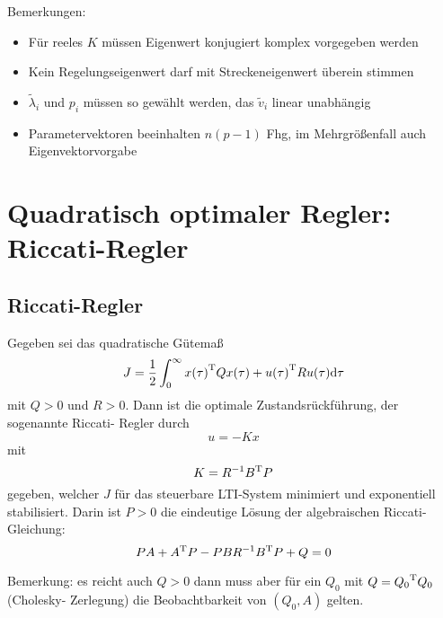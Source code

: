 Bemerkungen:
\begin{itemize}
    \item Für reeles $K$ müssen Eigenwert konjugiert komplex vorgegeben werden
    \item Kein Regelungseigenwert darf mit Streckeneigenwert überein stimmen
    \item $\tilde{\lambda}_i$ und $p_i$ müssen so gewählt werden, das $\tilde{v}_i$
        linear unabhängig
    \item Parametervektoren beeinhalten $n(p-1)$ Fhg, im Mehrgrößenfall
        auch Eigenvektorvorgabe
\end{itemize}

\section{Quadratisch optimaler Regler: Riccati-Regler}
\subsection{Riccati-Regler}
Gegeben sei das quadratische Gütemaß
\begin{equation}
    J = \frac{1}{2} \int_0^\infty {x(\tau)}^\text{T} Q x(\tau)
        + {u(\tau)}^\text{T} R u(\tau) \text{d} \tau
\end{equation}
mit $Q>0$ und $R>0$. Dann ist die optimale Zustandsrückführung, der sogenannte Riccati-
Regler durch
\begin{equation}
    u = -Kx
\end{equation}
mit
\begin{equation}
    K = R^{-1} {B}^\text{T} P
\end{equation}
gegeben, welcher $J$ für das steuerbare LTI-System
\sy
minimiert und exponentiell stabilisiert. Darin ist $P>0$ die eindeutige Lösung der
algebraischen Riccati-Gleichung:
\begin{equation}
    PA+{A}^\text{T}P-PBR^{-1}{B}^\text{T}P+Q=0
\end{equation}

Bemerkung: es reicht auch $Q>0$ dann muss aber für ein $Q_0$ mit $Q={Q_0}^\text{T}Q_0$ (Cholesky-
Zerlegung) die Beobachtbarkeit von $(Q_0, A)$ gelten.

